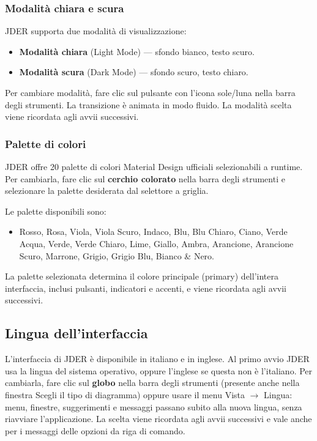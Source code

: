 \documentclass[a4paper,11pt]{article}
\newcommand\mediumweight{\fontseries{mb}\selectfont}
\newcommand\menu[1]{{\mediumweight\color{m3onprimarycontainer}#1}}
\newcommand\uielement[1]{{\mediumweight #1}}
\newcommand\jder{{\mediumweight JDER}}
\begin{document}
\subsubsection{Modalità chiara e scura}

\jder{} supporta due modalità di visualizzazione:
\begin{itemize}
  \item \textbf{Modalità chiara} (Light Mode) --- sfondo bianco, testo scuro.
  \item \textbf{Modalità scura} (Dark Mode) --- sfondo scuro, testo chiaro.
\end{itemize}

Per cambiare modalità, fare clic sul pulsante con l'icona sole/luna nella barra degli strumenti.
La transizione è animata in modo fluido. La modalità scelta viene ricordata agli avvii successivi.

\subsubsection{Palette di colori}

\jder{} offre 20 palette di colori Material Design ufficiali selezionabili a runtime.
Per cambiarla, fare clic sul \textbf{cerchio colorato} nella barra degli strumenti e selezionare
la palette desiderata dal selettore a griglia.

Le palette disponibili sono:
\begin{itemize}
  \item Rosso, Rosa, Viola, Viola Scuro, Indaco, Blu, Blu Chiaro, Ciano,
        Verde Acqua, Verde, Verde Chiaro, Lime, Giallo, Ambra, Arancione,
        Arancione Scuro, Marrone, Grigio, Grigio Blu, Bianco \& Nero.
\end{itemize}

La palette selezionata determina il colore principale (primary) dell'intera interfaccia,
inclusi pulsanti, indicatori e accenti, e viene ricordata agli avvii successivi.

\subsection{Lingua dell'interfaccia}
\label{sec:lingua}

L'interfaccia di \jder{} è disponibile in italiano e in inglese. Al primo avvio \jder{} usa la
lingua del sistema operativo, oppure l'inglese se questa non è l'italiano. Per cambiarla, fare
clic sul \textbf{globo} nella barra degli strumenti (presente anche nella finestra
\uielement{Scegli il tipo di diagramma}) oppure usare il menu \menu{Vista} $\to$ \menu{Lingua}:
menu, finestre, suggerimenti e messaggi passano subito alla nuova lingua, senza riavviare
l'applicazione. La scelta viene ricordata agli avvii successivi e vale anche per i messaggi delle
opzioni da riga di comando.
\end{document}

